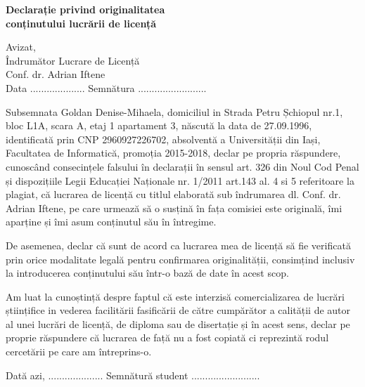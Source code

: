 \begin{center}
	\textbf{\large{Declarație privind originalitatea \\conținutului lucrării de licență}}
\end{center}
	
\begin{flushright}
	Avizat,\\
	Îndrumător Lucrare de Licență\\
	Conf. dr. Adrian Iftene\\
	Data \small{....................} Semnătura \small{.........................}
\end{flushright}

Subsemnata Goldan Denise-Mihaela, domiciliul in Strada Petru  Șchiopul nr.1, bloc L1A, scara A, etaj 1 apartament 3, născută la data de 27.09.1996, identificată prin CNP 2960927226702, absolventă a Universității  din Iași, Facultatea de Informatică, promoția 2015-2018, declar pe propria răspundere, cunoscând consecințele falsului în declarații în sensul art. 326 din Noul Cod Penal și dispozițiile Legii Educației Naționale nr. 1/2011 art.143 al. 4 si 5 referitoare la plagiat, că lucrarea de licență cu titlul  elaborată sub îndrumarea dl. Conf. dr. Adrian Iftene, pe care urmează să o susțină în fața comisiei este originală, îmi aparține și îmi asum conținutul său în întregime.

De asemenea, declar că sunt de acord ca lucrarea mea de licență să fie verificată prin orice modalitate legală pentru confirmarea originalității, consimțind inclusiv la introducerea conținutului său într-o bază de date în acest scop.

Am luat la cunoștință despre faptul că este interzisă comercializarea de lucrări științifice in vederea facilitării fasificării de către cumpărător a calității de autor al unei lucrări de licență, de diploma sau de disertație și în acest sens, declar pe proprie răspundere că lucrarea de față nu a fost copiată ci reprezintă rodul cercetării pe care am întreprins-o.

\hfill \break

Dată azi, \small{....................} \hfill Semnătură student \small{.........................} \\

\clearpage
